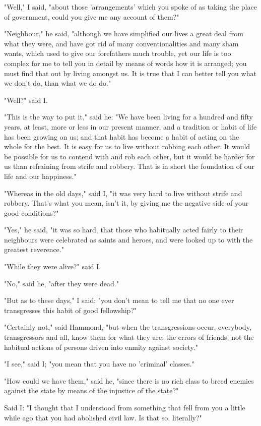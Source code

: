 "Well," I said, "about those 'arrangements' which you spoke of as taking
the place of government, could you give me any account of them?"

"Neighbour," he said, "although we have simplified our lives a great
deal from what they were, and have got rid of many conventionalities and
many sham wants, which used to give our forefathers much trouble, yet
our life is too complex for me to tell you in detail by means of words
how it is arranged; you must find that out by living amongst us. It is
true that I can better tell you what we don't do, than what we do do."

"Well?" said I.

"This is the way to put it," said he: "We have been living for a hundred
and fifty years, at least, more or less in our present manner, and a
tradition or habit of life has been growing on us; and that habit has
become a habit of acting on the whole for the best. It is easy for us to
live without robbing each other. It would be possible for us to contend
with and rob each other, but it would be harder for us than refraining
from strife and robbery. That is in short the foundation of our life and
our happiness."

"Whereas in the old days," said I, "it was very hard to live without
strife and robbery. That's what you mean, isn't it, by giving me the
negative side of your good conditions?"

"Yes," he said, "it was so hard, that those who habitually acted fairly
to their neighbours were celebrated as saints and heroes, and were
looked up to with the greatest reverence."

"While they were alive?" said I.

"No," said he, "after they were dead."

"But as to these days," I said; "you don't mean to tell me that no one
ever transgresses this habit of good fellowship?"

"Certainly not," said Hammond, "but when the transgressions occur,
everybody, transgressors and all, know them for what they are; the
errors of friends, not the habitual actions of persons driven into
enmity against society."

"I see," said I; "you mean that you have no 'criminal' classes."

"How could we have them," said he, "since there is no rich class to
breed enemies against the state by means of the injustice of the state?"

Said I: "I thought that I understood from something that fell from you a
little while ago that you had abolished civil law. Is that so,
literally?"

